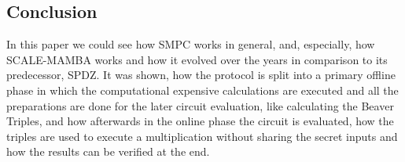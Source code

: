 \documentclass[english,runningheads,a4paper]{llncs}[2018/03/10]
\begin{document}
\subsection{Conclusion}

In this paper we could see how SMPC works in general, and, especially, how SCALE-MAMBA works and how it evolved over the years in comparison to its predecessor, SPDZ. It was shown, how the protocol is split into a primary offline phase in which the computational expensive calculations are executed and all the preparations are done for the later circuit evaluation, like calculating the Beaver Triples, and how afterwards in the online phase the circuit is evaluated, how the triples are used to execute a multiplication without sharing the secret inputs and how the results can be verified at the end. 





\renewcommand{\bibsection}{\section*{References}} %

\begingroup
  \ifluatex
  \else
  \fi
  \small %
  
\endgroup

\ \\
%
\end{document}
